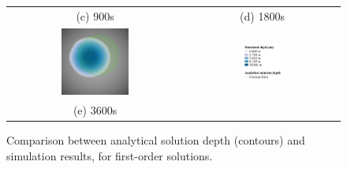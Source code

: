 \begin{figure}[tpb]
\begin{tabular}{cc}
		(c) 900s &
		(d) 1800s \\[6pt]
		\includegraphics[width=0.4\textwidth]{numerical-test-figures/parabolic-bowl-1O-depth-3600s.png} &
		\includegraphics[width=0.26\textwidth]{numerical-test-figures/parabolic-bowl-depth-legend.png} \\
		(e) 3600s &
	\end{tabular}
	\caption{Comparison between analytical solution depth (contours) and simulation results, for first-order solutions.}
	\label{TestResult_ParabolicBowl_1O}
\end{figure}
